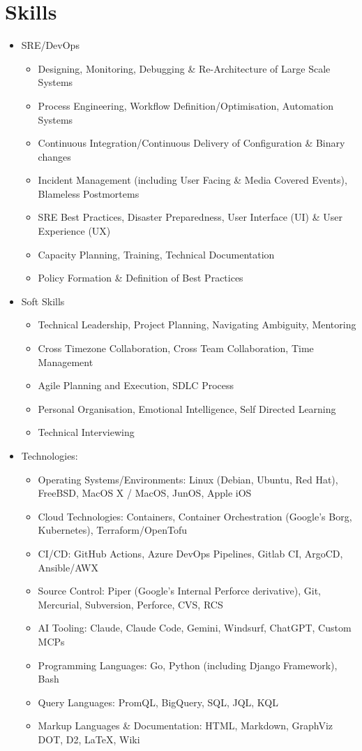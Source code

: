 \documentclass[a4paper, 10pt] {article}
\begin{document}
\section*{Skills}

\begin{itemize}[noitemsep]
\item SRE/DevOps
  \begin{itemize}[noitemsep]
  \item Designing, Monitoring, Debugging \& Re-Architecture of Large Scale Systems
  \item Process Engineering, Workflow Definition/Optimisation, Automation Systems
  \item Continuous Integration/Continuous Delivery of Configuration \& Binary changes
  \item Incident Management (including User Facing \& Media Covered Events), Blameless Postmortems
  \item SRE Best Practices, Disaster Preparedness, User Interface (UI) \& User Experience (UX)
  \item Capacity Planning, Training, Technical Documentation
  \item Policy Formation \& Definition of Best Practices
  \end{itemize}
\item Soft Skills
  \begin{itemize}[noitemsep]
  \item Technical Leadership, Project Planning, Navigating Ambiguity, Mentoring
  \item Cross Timezone Collaboration, Cross Team Collaboration, Time Management
  \item Agile Planning and Execution, SDLC Process
  \item Personal Organisation, Emotional Intelligence, Self Directed Learning
  \item Technical Interviewing
  \end{itemize}
\item Technologies:
  \begin{itemize}[noitemsep]
  \item Operating Systems/Environments: Linux (Debian, Ubuntu, Red Hat), FreeBSD, MacOS X / MacOS, JunOS, Apple iOS
  \item Cloud Technologies: Containers, Container Orchestration (Google's Borg, Kubernetes), Terraform/OpenTofu
  \item CI/CD: GitHub Actions, Azure DevOps Pipelines, Gitlab CI, ArgoCD, Ansible/AWX
  \item Source Control: Piper (Google's Internal Perforce derivative), Git, Mercurial, Subversion, Perforce, CVS, RCS
  \item AI Tooling: Claude, Claude Code, Gemini, Windsurf, ChatGPT, Custom MCPs
  \item Programming Languages: Go, Python (including Django Framework), Bash
  \item Query Languages: PromQL, BigQuery, SQL, JQL, KQL
  \item Markup Languages \& Documentation: HTML, Markdown, GraphViz DOT, D2, \LaTeX, Wiki
  \end{itemize}
\end{itemize}  
\end{document}
